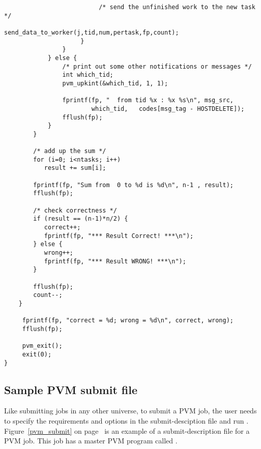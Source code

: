\begin{verbatim}
                          /* send the unfinished work to the new task */
                          send_data_to_worker(j,tid,num,pertask,fp,count);
                     }
                }
            } else {
                /* print out some other notifications or messages */
                int which_tid;
                pvm_upkint(&which_tid, 1, 1);
        
                fprintf(fp, "  from tid %x : %x %s\n", msg_src,
                        which_tid,   codes[msg_tag - HOSTDELETE]);
                fflush(fp);
            }
        }        
      
        /* add up the sum */
        for (i=0; i<ntasks; i++)
           result += sum[i];
          
        fprintf(fp, "Sum from  0 to %d is %d\n", n-1 , result);
        fflush(fp);
          
        /* check correctness */
        if (result == (n-1)*n/2) {
           correct++;
           fprintf(fp, "*** Result Correct! ***\n");
        } else {
           wrong++;
           fprintf(fp, "*** Result WRONG! ***\n");
        }

        fflush(fp);
        count--;
    }
     
     fprintf(fp, "correct = %d; wrong = %d\n", correct, wrong);
     fflush(fp);

     pvm_exit();
     exit(0);
}

\end{verbatim}
\normalsize

\subsection{Sample PVM submit file}
\label{submit}

Like submitting jobs in any other universe,
to submit a PVM job, the user needs to specify the requirements and
options in the submit-desciption file and run .  Figure~\ref{pvm_submit} on
page~\pageref{pvm_submit} is an example of
a submit-description file for a PVM job.  This job has a master PVM program called
.


